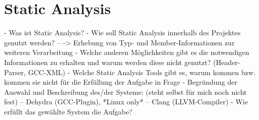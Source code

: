 \chapter{Static Analysis}

 - Was ist Static Analysis?
 - Wie soll Static Analysis innerhalb des Projektes genutzt werden?
 -- -> Erhebung von Typ- und Member-Informationen zur weiteren Verarbeitung
 - Welche anderen Möglichkeiten gibt es die notwendigen Informationen zu erhalten und warum werden diese nicht genutzt? (Header-Parser, GCC-XML)
 - Welche Static Analysis Tools gibt es, warum kommen bzw. kommen sie nicht für die Erfüllung der Aufgabe in Frage
 - Begründung der Auswahl und Beschreibung des/der Systeme: (steht selbst für mich noch nicht fest)
 -- Dehydra (GCC-Plugin), *Linux only*
 -- Clang (LLVM-Compiler)
 - Wie erfüllt das gewählte System die Aufgabe?